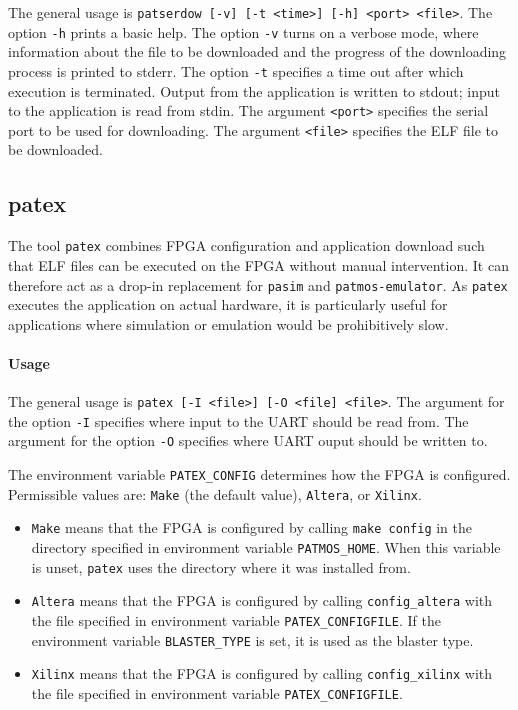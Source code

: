 \documentclass[a4paper,fontsize=10pt,twoside,DIV15,BCOR12mm,headinclude=true,footinclude=false,pagesize,bibtotoc]{scrbook}
\begin{document}
The general usage is \texttt{patserdow [-v] [-t <time>] [-h] <port> <file>}. The
option \texttt{-h} prints a basic help. The option \texttt{-v} turns
on a verbose mode, where information about the file to be downloaded
and the progress of the downloading process is printed to
stderr. The option \texttt{-t} specifies a time out after which execution is terminated.
Output from the application is written to stdout; input to the
application is read from stdin. The argument \texttt{<port>} specifies
the serial port to be used for downloading. The argument
\texttt{<file>} specifies the ELF file to be downloaded.

\subsection{patex}

The tool \texttt{patex} combines FPGA configuration and application
download such that ELF files can be executed on the FPGA without
manual intervention. It can therefore act as a drop-in replacement for
\texttt{pasim} and \texttt{patmos-emulator}. As \texttt{patex}
executes the application on actual hardware, it is particularly useful
for applications where simulation or emulation would be prohibitively
slow.

\paragraph{Usage}

The general usage is \texttt{patex [-I <file>] [-O <file] <file>}. The
argument for the option \texttt{-I} specifies where input to the UART
should be read from. The argument for the option \texttt{-O} specifies
where UART ouput should be written to.

The environment variable \texttt{PATEX\_CONFIG} determines how the
FPGA is configured. Permissible values are: \texttt{Make} (the default
value), \texttt{Altera}, or \texttt{Xilinx}.
\begin{itemize}
\item \texttt{Make} means that the FPGA is configured by calling
  \texttt{make config} in the directory specified in environment
  variable \texttt{PATMOS\_HOME}. When this variable is unset,
  \texttt{patex} uses the directory where it was installed from.
\item \texttt{Altera} means that the FPGA is configured by calling
  \texttt{config\_altera} with the file specified in environment
  variable \texttt{PATEX\_CONFIGFILE}. If the environment variable
  \texttt{BLASTER\_TYPE} is set, it is used as the blaster type.
\item \texttt{Xilinx} means that the FPGA is configured by calling
  \texttt{config\_xilinx} with the file specified in environment
  variable \texttt{PATEX\_CONFIGFILE}.
\end{itemize}
\end{document}
